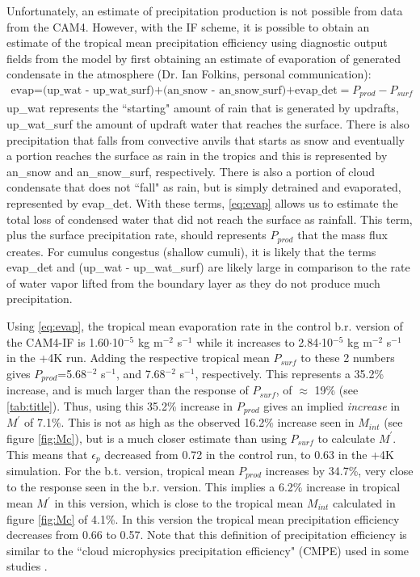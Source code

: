 \documentclass[letterpaper,12pt,titlepage,oneside,final]{book}
\begin{document}
Unfortunately, an estimate of precipitation production is not possible from data from the CAM4. However, with the IF scheme, it is possible to obtain an estimate of the tropical mean precipitation efficiency using diagnostic output fields from the model by first obtaining an estimate of evaporation of generated condensate in the atmosphere (Dr. Ian Folkins, personal communication):
\begin{align}\label{eq:evap}
\text{evap=(up\_wat - up\_wat\_surf)+(an\_snow - an\_snow\_surf)+evap\_det}=P_{prod}-P_{surf}
\end{align}
up\_wat represents the ``starting" amount of rain that is generated by updrafts, up\_wat\_surf the amount of updraft water that reaches the surface. There is also precipitation that falls from convective anvils that starts as snow and eventually a portion reaches the surface as rain in the tropics and this is represented by an\_snow and an\_snow\_surf, respectively. There is also a portion of cloud condensate that does not ``fall" as rain, but is simply detrained and evaporated, represented by evap\_det. With these terms, \ref{eq:evap} allows us to estimate the total loss of condensed water that did not reach the surface as rainfall. This term, plus the surface precipitation rate, should represents $P_{prod}$ that the mass flux creates. For cumulus congestus (shallow cumuli), it is likely that the terms evap\_det and (up\_wat - up\_wat\_surf) are likely large in comparison to the rate of water vapor lifted from the boundary layer as they do not produce much precipitation.

Using \ref{eq:evap}, the tropical mean evaporation rate in the control b.r. version of the CAM4-IF is 1.60$\cdot$10$^{-5}$ kg m$^{-2}$ s$^{-1}$ while it increases to 2.84$\cdot$10$^{-5}$ kg m$^{-2}$ s$^{-1}$ in the +4K run. Adding the respective tropical mean $P_{surf}$ to these 2 numbers gives $P_{prod}$=5.68$^{-2}$ s$^{-1}$, and 7.68$^{-2}$ s$^{-1}$, respectively. This represents a 35.2\% increase, and is much larger than the response of $P_{surf}$, of $\approx$ 19\% (see \ref{tab:title}). Thus, using this 35.2\% increase in $P_{prod}$ gives an implied \textit{increase} in $M^{'}$ of 7.1\%. This is not as high as the observed 16.2\% increase seen in $M_{int}$ (see figure \ref{fig:Mc}), but is a much closer estimate than using $P_{surf}$ to calculate $M^{'}$. This means that $\epsilon_{p}$ decreased from 0.72 in the control run, to 0.63 in the +4K simulation. For the b.t. version, tropical mean $P_{prod}$ increases by 34.7\%, very close to the response seen in the b.r. version. This implies a 6.2\% increase in tropical mean $M^{'}$ in this version, which is close to the tropical mean $M_{int}$ calculated in figure \ref{fig:Mc} of 4.1\%. In this version the tropical mean precipitation efficiency decreases from 0.66 to 0.57. Note that this definition of precipitation efficiency is similar to the ``cloud microphysics precipitation efficiency" (CMPE) used in some studies \citep{schoenberg_ferrier_factors_1996,sui_definition_2007}.
\end{document}
